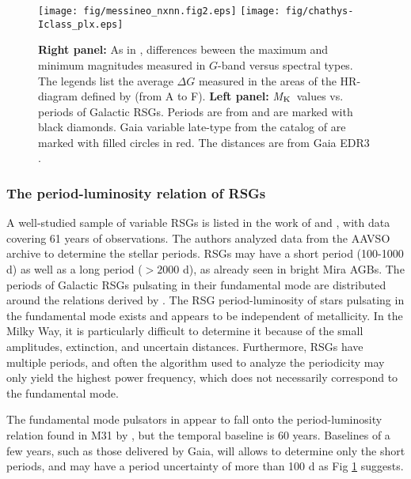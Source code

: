 \documentclass[final,11pt,onecolumn,a4paper,twoside]{scrbook_gj}
\def\Mk{\hbox{\it M$_{\rm K}$}}
\begin{document}
\begin{figure}[ht!]
\begin{center} 
  \texttt{[image: fig/messineo\_nxnn.fig2.eps]}      
  \texttt{[image: fig/chathys-Iclass\_plx.eps]}      
\end{center}
\caption{ \label{fig.gaiaampl} 
{\bf Right panel:} As in \citet{messineo20var}, differences beween the maximum and minimum 
magnitudes measured in $G$-band versus spectral types. The legends list 
the average $\Delta G$ measured in the areas of the HR-diagram defined 
by \citet{messineo19} (from A to F). {\bf Left panel:}
\Mk\ values vs. periods of Galactic RSGs. 
Periods are from \citet{chatys19} and are marked with black diamonds. 
Gaia variable late-type from the catalog of \citet{messineo19}
are marked with filled circles in red.  
The distances are from Gaia EDR3 \citep{messineo21z}.
}
\end{figure}


\subsubsection{The period-luminosity relation of RSGs}\label{law}

A well-studied sample of variable RSGs is listed in the work of 
\citet{chatys19} and \citet{kiss06}, with data covering 
61 years of observations.
The authors analyzed data from the AAVSO archive to determine
the stellar periods. RSGs may have a short
period (100-1000 d) as well as a long period
($>2000$ d), as already seen in bright Mira AGBs.  
The periods of Galactic RSGs pulsating in 
their fundamental mode are distributed around the relations
derived by  \citet{soreisam18}.
The RSG period-luminosity of stars pulsating in the 
fundamental mode exists and appears to be independent
of metallicity.  In the Milky Way, it is particularly difficult to
determine it because of the small amplitudes, extinction, and 
uncertain distances. Furthermore, RSGs have multiple periods,
and often the  algorithm used to analyze the periodicity 
may only yield the highest power frequency, which does not 
necessarily correspond to the fundamental mode. 

The fundamental mode pulsators in \citet{chatys19} 
appear to  fall onto the  period-luminosity 
relation found in M31 by \citet{soreisam18}, 
but the temporal baseline is 60 years. 
Baselines  of a few years, such as those delivered by Gaia,
will allows to determine only the short periods, and
may have a period uncertainty of more than 100 d
as Fig \ref{fig.gaiaampl} suggests.
\end{document}
